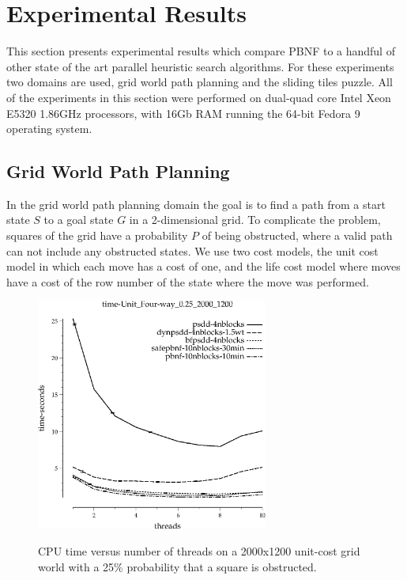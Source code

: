 \documentclass{article}
\begin{document}
\section{Experimental Results}

This section presents experimental results which compare PBNF to a
handful of other state of the art parallel heuristic search
algorithms.  For these experiments two domains are used, grid world
path planning and the sliding tiles puzzle.  All of the experiments in
this section were performed on dual-quad core Intel Xeon E5320
1.86GHz processors, with 16Gb RAM running the 64-bit Fedora 9
operating system.

\subsection{Grid World Path Planning}

In the grid world path planning domain the goal is to find a path from
a start state $S$ to a goal state $G$ in a 2-dimensional grid.  To
complicate the problem, squares of the grid have a probability $P$ of
being obstructed, where a valid path can not include any obstructed
states.  We use two cost models, the unit cost model in which each
move has a cost of one, and the life cost model where moves have a
cost of the row number of the state where the move was performed.

\begin{figure}[t]
\includegraphics[width=3in]{../graphs/grid_unit_four-way_0.25_2000_1200/time-Unit_Four-way_0.25_2000_1200.eps}
\label{fig:grid-unit}
\caption{CPU time versus number of threads on a 2000x1200 unit-cost
  grid world with a 25\% probability that a square is obstructed.}
\end{figure}
\end{document}
